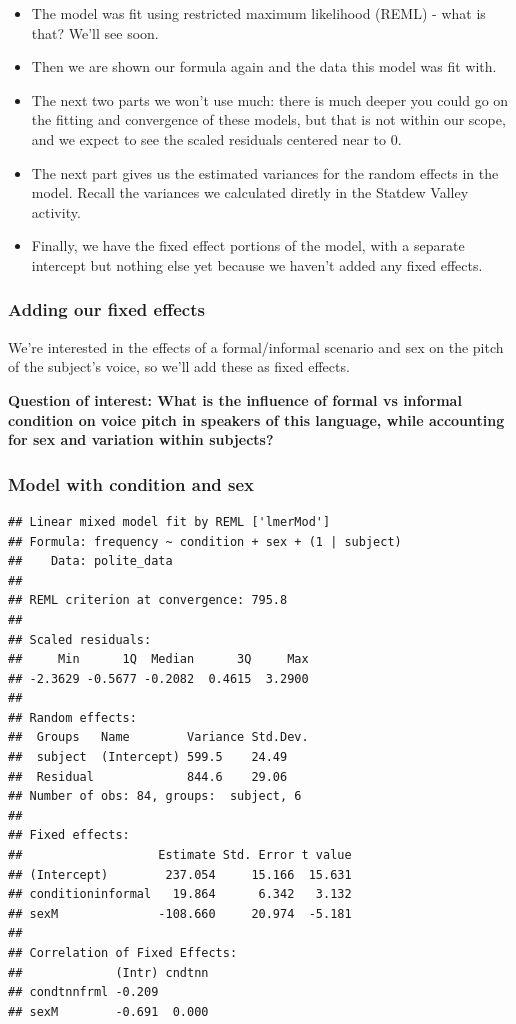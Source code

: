 \documentclass[
  openany]{book}
\providecommand{\tightlist}{%
  \setlength{\itemsep}{0pt}\setlength{\parskip}{0pt}}
\begin{document}
\begin{itemize}
\tightlist
\item
  The model was fit using restricted maximum likelihood (REML) - what is that? We'll see soon.\\
\item
  Then we are shown our formula again and the data this model was fit with.
\item
  The next two parts we won't use much: there is much deeper you could go on the fitting and convergence of these models, but that is not within our scope, and we expect to see the scaled residuals centered near to 0.
\item
  The next part gives us the estimated variances for the random effects in the model. Recall the variances we calculated diretly in the Statdew Valley activity.
\item
  Finally, we have the fixed effect portions of the model, with a separate intercept but nothing else yet because we haven't added any fixed effects.
\end{itemize}

\hypertarget{adding-our-fixed-effects}{%
\subsubsection{Adding our fixed effects}\label{adding-our-fixed-effects}}

We're interested in the effects of a formal/informal scenario and sex on the pitch of the subject's voice, so we'll add these as fixed effects.

\textbf{Question of interest: What is the influence of formal vs informal condition on voice pitch in speakers of this language, while accounting for sex and variation within subjects?}

\hypertarget{model-with-condition-and-sex}{%
\subsubsection{Model with condition and sex}\label{model-with-condition-and-sex}}

\begin{verbatim}
## Linear mixed model fit by REML ['lmerMod']
## Formula: frequency ~ condition + sex + (1 | subject)
##    Data: polite_data
## 
## REML criterion at convergence: 795.8
## 
## Scaled residuals: 
##     Min      1Q  Median      3Q     Max 
## -2.3629 -0.5677 -0.2082  0.4615  3.2900 
## 
## Random effects:
##  Groups   Name        Variance Std.Dev.
##  subject  (Intercept) 599.5    24.49   
##  Residual             844.6    29.06   
## Number of obs: 84, groups:  subject, 6
## 
## Fixed effects:
##                   Estimate Std. Error t value
## (Intercept)        237.054     15.166  15.631
## conditioninformal   19.864      6.342   3.132
## sexM              -108.660     20.974  -5.181
## 
## Correlation of Fixed Effects:
##             (Intr) cndtnn
## condtnnfrml -0.209       
## sexM        -0.691  0.000
\end{verbatim}
\end{document}
